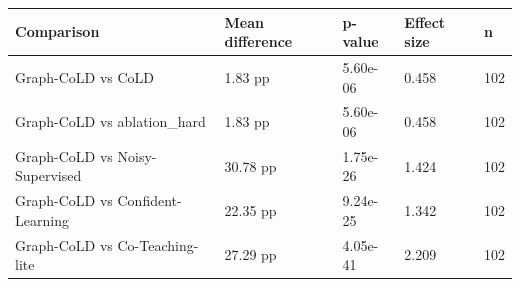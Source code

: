 \small
\begin{tabular}{lllll}
\hline
Comparison & Mean difference & p-value & Effect size & n \\
\hline
Graph-CoLD vs CoLD & 1.83 pp & 5.60e-06 & 0.458 & 102 \\
Graph-CoLD vs ablation\_hard & 1.83 pp & 5.60e-06 & 0.458 & 102 \\
Graph-CoLD vs Noisy-Supervised & 30.78 pp & 1.75e-26 & 1.424 & 102 \\
Graph-CoLD vs Confident-Learning & 22.35 pp & 9.24e-25 & 1.342 & 102 \\
Graph-CoLD vs Co-Teaching-lite & 27.29 pp & 4.05e-41 & 2.209 & 102 \\
\hline
\end{tabular}
